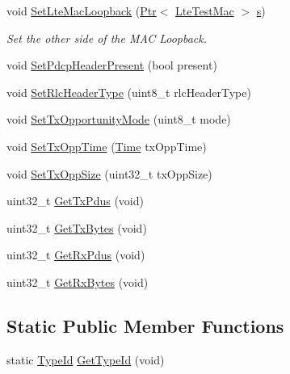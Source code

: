 \begin{DoxyCompactItemize}
void \hyperlink{classns3_1_1LteTestMac_a51d2167044a15f73bde55967ca8bb63f}{Set\+Lte\+Mac\+Loopback} (\hyperlink{classns3_1_1Ptr}{Ptr}$<$ \hyperlink{classns3_1_1LteTestMac}{Lte\+Test\+Mac} $>$ \hyperlink{generate__test__data__lte__sinr_8m_ad83eeb3a142285d1243a08c6b7026df8}{s})
\begin{DoxyCompactList}\small\item\em Set the other side of the M\+AC Loopback. \end{DoxyCompactList}\item 
void \hyperlink{classns3_1_1LteTestMac_a35c08fbe4118281484c20bf2d7435828}{Set\+Pdcp\+Header\+Present} (bool present)
\item 
void \hyperlink{classns3_1_1LteTestMac_acbe465027c32200d31d1785419993ddd}{Set\+Rlc\+Header\+Type} (uint8\+\_\+t rlc\+Header\+Type)
\item 
void \hyperlink{classns3_1_1LteTestMac_af48f53304281f34d121eec2fecb85f6d}{Set\+Tx\+Opportunity\+Mode} (uint8\+\_\+t mode)
\item 
void \hyperlink{classns3_1_1LteTestMac_aeaa7f68b716b8ee044bd7af49f4ca141}{Set\+Tx\+Opp\+Time} (\hyperlink{classns3_1_1Time}{Time} tx\+Opp\+Time)
\item 
void \hyperlink{classns3_1_1LteTestMac_a650a080a34f7f31d97ec3a6daea651bb}{Set\+Tx\+Opp\+Size} (uint32\+\_\+t tx\+Opp\+Size)
\item 
uint32\+\_\+t \hyperlink{classns3_1_1LteTestMac_a04d893d376960c0fc0adbc982b32c0cc}{Get\+Tx\+Pdus} (void)
\item 
uint32\+\_\+t \hyperlink{classns3_1_1LteTestMac_aedbefd9214f04ff1027d267f3d097d4f}{Get\+Tx\+Bytes} (void)
\item 
uint32\+\_\+t \hyperlink{classns3_1_1LteTestMac_ab2ba8d5fc32e1327e353330fac2ffdea}{Get\+Rx\+Pdus} (void)
\item 
uint32\+\_\+t \hyperlink{classns3_1_1LteTestMac_a263ba3e412bf9119b8add083733bb335}{Get\+Rx\+Bytes} (void)
\end{DoxyCompactItemize}
\subsection*{Static Public Member Functions}
\begin{DoxyCompactItemize}
\item 
static \hyperlink{classns3_1_1TypeId}{Type\+Id} \hyperlink{classns3_1_1LteTestMac_a88a155f8ada03ec025490d5af3351054}{Get\+Type\+Id} (void)
\end{DoxyCompactItemize}
